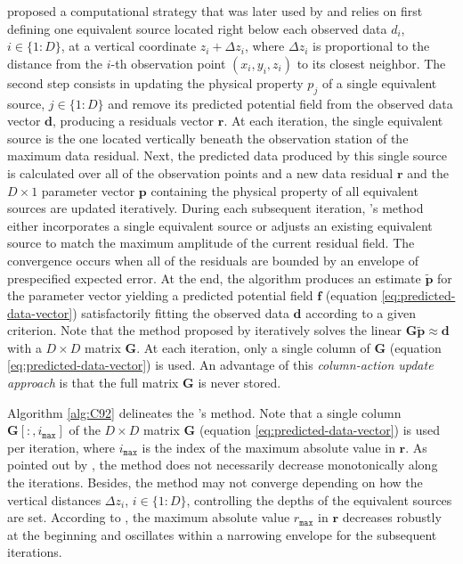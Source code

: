 \cite{cordell1992} proposed a computational strategy that was later used by \cite{guspi-novara2009} and relies on
first defining one equivalent source located right below each observed data $d_{i}$, $i \in \{1:D\}$, at a vertical
coordinate $z_{i} + \Delta z_{i}$, where $\Delta z_{i}$ is proportional to the distance from the $i$-th observation point 
$(x_{i}, y_{i}, z_{i})$ to its closest neighbor.
The second step consists in updating the physical property $p_{j}$ of a single equivalent source, $j \in \{1:D\}$ and 
remove its predicted potential field from the observed data vector $\mathbf{d}$, producing a residuals vector $\mathbf{r}$.
At each iteration, the single equivalent source is the one located vertically beneath the observation station of the maximum data residual. 
Next, the predicted data produced by this single source is calculated over all of the observation points and 
a new data residual $\mathbf{r}$ and the $D \times 1$ parameter vector $\mathbf{p}$ containing the physical property 
of all equivalent sources are updated iteratively. 
During each subsequent iteration,  \citeauthor{cordell1992}'s method 
either incorporates a single equivalent source or adjusts an existing equivalent source to match the maximum amplitude 
of the current residual field.
The convergence occurs when all of the residuals are bounded by an envelope of prespecified expected error.
At the end, the algorithm produces an estimate $\tilde{\mathbf{p}}$ for the parameter vector yielding a predicted
potential field $\mathbf{f}$ (equation \ref{eq:predicted-data-vector}) satisfactorily fitting the observed data
$\mathbf{d}$ according to a given criterion.
Note that the method proposed by \cite{cordell1992} iteratively solves the linear $\mathbf{G} \tilde{\mathbf{p}} \approx \mathbf{d}$
with a $D \times D$ matrix $\mathbf{G}$. At each iteration, only a single column of $\mathbf{G}$ (equation \ref{eq:predicted-data-vector}) 
is used.
An advantage of this \textit{column-action update approach} is that the full matrix $\mathbf{G}$ is never stored.

Algorithm \ref{alg:C92} delineates the \citeauthor{cordell1992}'s method.
Note that a single column $\mathbf{G}[:, i_{\mathtt{max}}]$ of the $D \times D$ matrix $\mathbf{G}$ (equation \ref{eq:predicted-data-vector})
is used per iteration, where $i_{\mathtt{max}}$ is the index of the maximum absolute value in $\mathbf{r}$.
As pointed out by \cite{cordell1992}, the method does not necessarily decrease monotonically along the iterations.
Besides, the method may not converge depending on how the vertical distances $\Delta z_{i}$, $i \in \{1:D\}$, 
controlling the depths of the equivalent sources are set.
According to \cite{cordell1992}, the maximum absolute value $r_{\mathtt{max}}$ in $\mathbf{r}$ decreases robustly at the beginning 
and oscillates within a narrowing envelope for the subsequent iterations.

